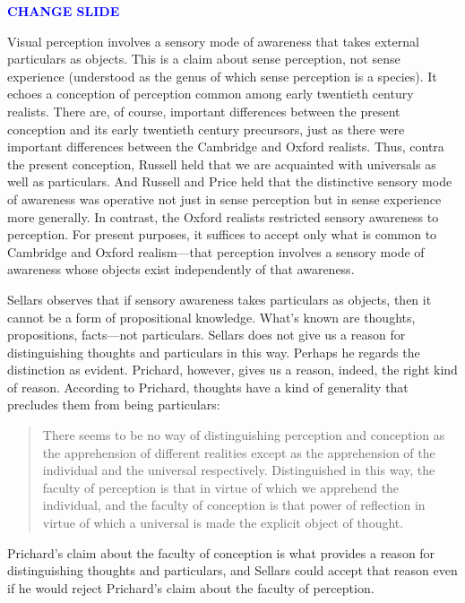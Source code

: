 \documentclass[12pt]{article}
\newcommand{\change}{\textcolor{blue}{\textbf{CHANGE SLIDE}}}
\begin{document}
\change

Visual perception involves a sensory mode of awareness that takes external particulars as objects. This is a claim about sense perception, not sense experience (understood as the genus of which sense perception is a species). It echoes a conception of perception common among early twentieth century realists. There are, of course, important differences between the present conception and its early twentieth century precursors, just as there were important differences between the Cambridge and Oxford realists. Thus, contra the present conception, Russell held that we are acquainted with universals as well as particulars. And Russell and Price held that the distinctive sensory mode of awareness was operative not just in sense perception but in sense experience more generally. In contrast, the Oxford realists restricted sensory awareness to perception. For present purposes, it suffices to accept only what is common to Cambridge and Oxford realism---that perception involves a sensory mode of awareness whose objects exist independently of that awareness. 

Sellars observes that if sensory awareness takes particulars as objects, then it cannot be a form of propositional knowledge. What's known are thoughts, propositions, facts\----\-not par\-ti\-cu\-lars. Sellars does not give us a reason for distinguishing thoughts and particulars in this way. Perhaps he regards the distinction as evident. Prichard, however, gives us a reason, indeed, the right kind of reason. According to Prichard, thoughts have a kind of generality that precludes them from being particulars:
\begin{quote}
	There seems to be no way of distinguishing perception and conception as the apprehension of different realities except as the apprehension of the individual and the universal respectively. Distinguished in this way, the faculty of perception is that in virtue of which we apprehend the individual, and the faculty of conception is that power of reflection in virtue of which a universal is made the explicit object of thought.
\end{quote}
Prichard's claim about the faculty of conception is what provides a reason for distinguishing thoughts and particulars, and Sellars could accept that reason even if he would reject Prichard's claim about the faculty of perception.
\end{document}
